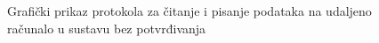 \documentclass[times, utf8, zavrsni, square]{fer}
\begin{document}
\begin{figure}[h!]
    \centering
    \centering
    \caption{Grafički prikaz protokola za čitanje i pisanje podataka na udaljeno računalo u sustavu bez potvrđivanja}
    \label{fig:graf_2}
\end{figure}
\end{document}
